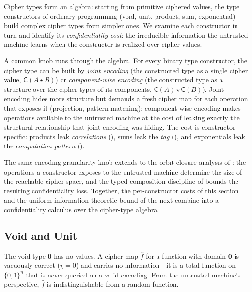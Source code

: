 \documentclass[11pt]{article}
\theoremstyle{definition}
\theoremstyle{plain}
\theoremstyle{remark}
\newcommand{\fhat}{\hat{f}}
\newcommand{\cipher}[1]{\mathsf{C}(#1)}
\newcommand{\B}{\{0,1\}}
\begin{document}
Cipher types form an algebra: starting from primitive ciphered values,
the type constructors of ordinary programming (void, unit, product,
sum, exponential) build complex cipher types from simpler ones.
We examine each constructor in turn and identify its
\emph{confidentiality cost}: the irreducible information the untrusted
machine learns when the constructor is realized over cipher values.

A common knob runs through the algebra.
For every binary type constructor, the cipher type can be built by
\emph{joint encoding} (the constructed type as a single cipher value,
$\cipher{A \star B}$) or \emph{component-wise encoding} (the
constructed type as a structure over the cipher types of its
components, $\cipher{A} \star \cipher{B}$).
Joint encoding hides more structure but demands a fresh cipher map for
each operation that exposes it (projection, pattern matching);
component-wise encoding makes operations available to the untrusted
machine at the cost of leaking exactly the structural relationship
that joint encoding was hiding.
The cost is constructor-specific:
products leak \emph{correlations} (),
sums leak the \emph{tag} (),
and exponentials leak the \emph{computation pattern}
().

The same encoding-granularity knob extends to the orbit-closure
analysis of : the operations a constructor exposes
to the untrusted machine determine the size of the reachable cipher
space, and the typed-composition discipline of
 bounds the resulting confidentiality loss.
Together, the per-constructor costs of this section and the uniform
information-theoretic bound of the next combine into a confidentiality
calculus over the cipher-type algebra.


\subsection{Void and Unit}
\label{sec:void-unit}

The void type $\mathbf{0}$ has no values.
A cipher map $\fhat$ for a function with domain $\mathbf{0}$ is vacuously
correct ($\eta = 0$) and carries no information---it is a total function
on $\B^n$ that is never queried on a valid encoding.
From the untrusted machine's perspective, $\fhat$ is indistinguishable from
a random function.
\end{document}

